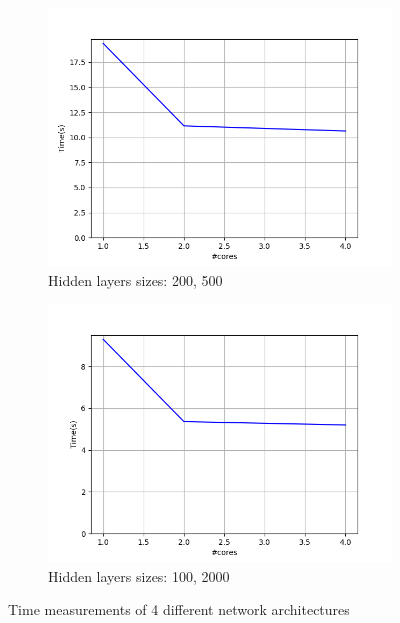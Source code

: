 \documentclass{article}
\begin{document}
\begin{figure}[t]
	\vspace*{-0.3em}
	
	\hspace*{-10em}
	\begin{subfigure}[b]{.3\textwidth}
		\includegraphics[scale=0.55]{fig/Figure_3.png}
		\parbox{8cm}{\caption{Hidden layers sizes: 200, 500}}
		\label{fig:c3}
	\end{subfigure}\hspace*{10.3em}
	\begin{subfigure}[b]{.3\textwidth}
		\includegraphics[scale=0.55]{fig/Figure_2.png}
		\parbox{8cm}{\caption[long]{Hidden layers sizes: 100, 2000}}
		\label{fig:c4}
	\end{subfigure}
	\caption{Time measurements of 4 different network architectures}
	\label{fig:results}
\end{figure}
%	
\end{document}
